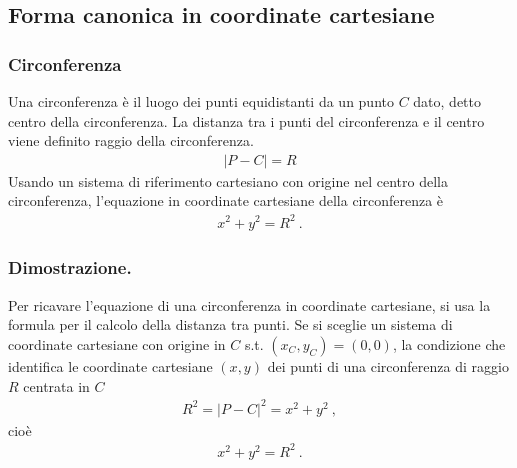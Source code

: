 \documentclass[letterpaper,10pt,italian]{jupyterBook}
\begin{document}
\sphinxstepscope


\subsection{Forma canonica in coordinate cartesiane}
\label{\detokenize{ch/analytic_geometry/analytic_geometry_2d/conics-cartesian:forma-canonica-in-coordinate-cartesiane}}\label{\detokenize{ch/analytic_geometry/analytic_geometry_2d/conics-cartesian:geometry-analytic-2d-conics-cartesian}}\label{\detokenize{ch/analytic_geometry/analytic_geometry_2d/conics-cartesian::doc}}

\subsubsection{Circonferenza}
\label{\detokenize{ch/analytic_geometry/analytic_geometry_2d/conics-cartesian:circonferenza}}
\sphinxAtStartPar
Una circonferenza è il luogo dei punti equidistanti da un punto \(C\) dato, detto centro della circonferenza. La distanza tra i punti del circonferenza e il centro viene definito raggio della circonferenza.
\begin{equation*}
\begin{split}|P - C| = R\end{split}
\end{equation*}
\sphinxAtStartPar
Usando un sistema di riferimento cartesiano con origine nel centro della circonferenza, l’equazione in coordinate cartesiane della circonferenza è
\begin{equation*}
\begin{split}x^2 + y^2 = R^2 \ .\end{split}
\end{equation*}\subsubsection*{Dimostrazione.}

\sphinxAtStartPar
Per ricavare l’equazione di una circonferenza in coordinate cartesiane, si usa la formula per il calcolo della distanza tra punti. Se si sceglie un sistema di coordinate cartesiane con origine in \(C\) s.t. \((x_C, y_C) = (0,0)\), la condizione che identifica le coordinate cartesiane \((x,y)\) dei punti di una circonferenza di raggio \(R\) centrata in \(C\)
\begin{equation*}
\begin{split}R^2 = |P-C|^2 = x^2 + y^2 \ ,\end{split}
\end{equation*}
\sphinxAtStartPar
cioè
\begin{equation*}
\begin{split}x^2 + y^2 = R^2 \ .\end{split}
\end{equation*}
\end{document}
